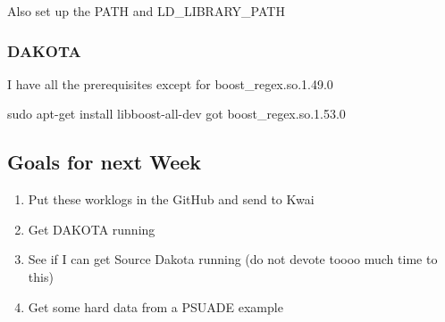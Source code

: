 \documentclass[11pt]{article} %
\begin{document}
Also set up the PATH and LD\_LIBRARY\_PATH

\subsubsection{DAKOTA}
I have all the prerequisites except for boost\_regex.so.1.49.0

sudo apt-get install libboost-all-dev got boost\_regex.so.1.53.0

\subsection{Goals for next Week}
\begin{enumerate}
\item Put these worklogs in the GitHub and send to Kwai
\item Get DAKOTA running
\item See if I can get Source Dakota running (do not devote toooo much time to this)
\item Get some hard data from a PSUADE example
\end{enumerate}
\end{document}
